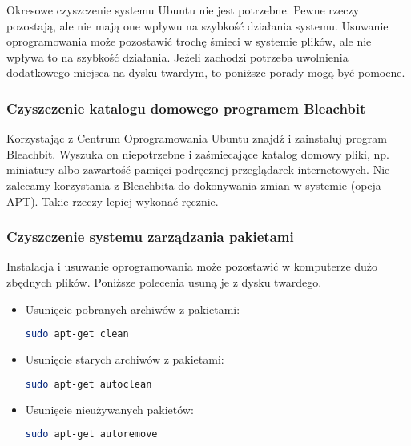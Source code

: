 Okresowe czyszczenie systemu Ubuntu nie jest potrzebne. Pewne rzeczy pozostają, ale nie mają one wpływu na szybkość działania systemu. Usuwanie oprogramowania może pozostawić trochę śmieci w systemie plików, ale nie wpływa to na szybkość działania. Jeżeli zachodzi potrzeba uwolnienia dodatkowego miejsca na dysku twardym, to poniższe porady mogą być pomocne.

\subsubsection{Czyszczenie katalogu domowego programem Bleachbit}
Korzystając z Centrum Oprogramowania Ubuntu znajdź i zainstaluj program \textcolor{ubuntu_orange}{Bleachbit}. Wyszuka on niepotrzebne i zaśmiecające katalog domowy pliki, np. miniatury albo zawartość pamięci podręcznej przeglądarek internetowych. Nie zalecamy korzystania z Bleachbita do dokonywania zmian w systemie (opcja APT). Takie rzeczy lepiej wykonać ręcznie.

\subsubsection{Czyszczenie systemu zarządzania pakietami}
Instalacja i usuwanie oprogramowania może pozostawić w komputerze dużo zbędnych plików. Poniższe polecenia usuną je z dysku twardego.
\begin{itemize}
\item Usunięcie pobranych archiwów z pakietami:
\begin{lstlisting}[language=bash]
sudo apt-get clean
\end{lstlisting}
\item Usunięcie starych archiwów z pakietami:
\begin{lstlisting}[language=bash]
sudo apt-get autoclean
\end{lstlisting}
\item Usunięcie nieużywanych pakietów:
\begin{lstlisting}[language=bash]
sudo apt-get autoremove
\end{lstlisting}
\end{itemize}

